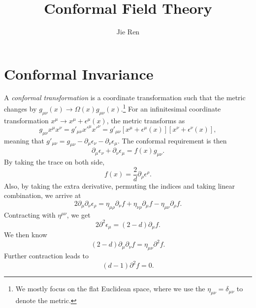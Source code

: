 \documentclass[aps,prb,superscriptaddress,nofootinbib]{revtex4}
\begin{document}
\title{Conformal Field Theory}
\author{Jie Ren}


\maketitle


\tableofcontents

\section{Conformal Invariance}

A \textit{conformal transformation} is a coordinate transformation such that the metric changes by $g_{\mu\nu}(x) \rightarrow \Omega(x) g_{\mu\nu}(x)$.\footnote{We mostly focus on the flat Euclidean space, where we use the $\eta_{\mu\nu} = \delta_{\mu\nu}$ to denote the metric.}
For an infinitesimal coordinate transformation $x^\mu \rightarrow x^\mu + \epsilon^\mu(x)$, the metric transforms as
\begin{equation}
	g_{\mu\nu}x^\mu x^\nu = g'_{\mu\nu}{x'}^\mu {x'}^\nu = g'_{\mu\nu}[x^\mu+\epsilon^\mu(x)][x^\nu+\epsilon^\nu(x)],
\end{equation}
meaning that $g'_{\mu\nu} = g_{\mu\nu}-\partial_\mu \epsilon_\nu - \partial_\nu \epsilon_\mu$.
The conformal requirement is then
\begin{equation}
	\partial_\mu \epsilon_\nu + \partial_\nu \epsilon_\mu = f(x) g_{\mu\nu}.
\end{equation}
By taking the trace on both side, 
\begin{equation}
	f(x) = \frac{2}{d}\partial_\rho \epsilon^\rho.
\end{equation}
Also, by taking the extra derivative, permuting the indices and taking linear combination, we arrive at
\begin{equation}
	2\partial_\mu \partial_\nu \epsilon_\rho = \eta_{\mu\rho}\partial_\nu f +\eta_{\nu\rho}\partial_{\mu}f-\eta_{\mu\nu}\partial_\rho f.
\end{equation}
Contracting with $\eta^{\mu\nu}$, we get 
\begin{equation}
	2\partial^2 \epsilon_\mu=(2-d)\partial_\mu f.
\end{equation}
We then know 
\begin{equation}
	(2-d)\partial_\mu\partial_\nu f = \eta_{\mu\nu}\partial^2 f.
\end{equation}
Further contraction leads to 
\begin{equation}
	(d-1)\partial^2 f=0.
\end{equation}
\end{document}
